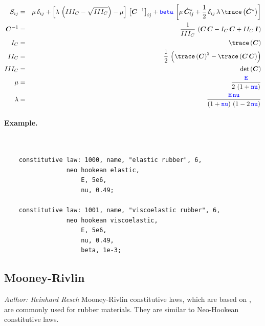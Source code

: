 \begin{eqnarray}
  S_{ij} & = & \mu \, \delta_{ij} + \left[\lambda \, \left(III_C - \sqrt{III_C} \right) - \mu\right] \, \left[ \boldsymbol{C}^{-1} \right]_{ij}
  + \nt{beta} \, \left[\mu \, \dot{\boldsymbol{C}}_{ij}^{\star} + \frac{1}{2} \, \delta_{ij} \, \lambda \, \trace\left(\dot{\boldsymbol{C}}^{\star}\right)\right]\\
  \boldsymbol{C}^{-1} & = & \frac{1}{III_C} \, \left(\boldsymbol{C} \, \boldsymbol{C} - I_C \, \boldsymbol{C} + II_C \, \boldsymbol{I} \right) \\
  I_C & = & \trace\left(\boldsymbol{C}\right) \\
  II_C & = & \frac{1}{2} \,\left(\trace\left(\boldsymbol{C}\right)^2 - \trace\left(\boldsymbol{C} \, \boldsymbol{C}\right)\right) \\
  III_C & = & \det\left(\boldsymbol{C}\right) \\
  \mu & = & \frac{\nt{E}}{2 \, \left(1 + \nt{nu}\right)} \\
  \lambda & = & \frac{\nt{E} \, \nt{nu}}{\left(1 + \nt{nu}\right) \, \left(1 - 2 \, \nt{nu} \right)}
\end{eqnarray}

\paragraph{Example.} \
\begin{verbatim}
    constitutive law: 1000, name, "elastic rubber", 6,
                 neo hookean elastic,
                     E, 5e6,
                     nu, 0.49;

    constitutive law: 1001, name, "viscoelastic rubber", 6,
                 neo hookean viscoelastic,
                     E, 5e6,
                     nu, 0.49,
                     beta, 1e-3;
\end{verbatim}

\subsection{Mooney-Rivlin}
\label{sec:CL:mooney-rivlin}
\emph{Author: Reinhard Resch}
Mooney-Rivlin constitutive laws, which are based on \cite{BATHE2016}, are commonly used for rubber materials.
They are similar to Neo-Hookean constitutive laws.
